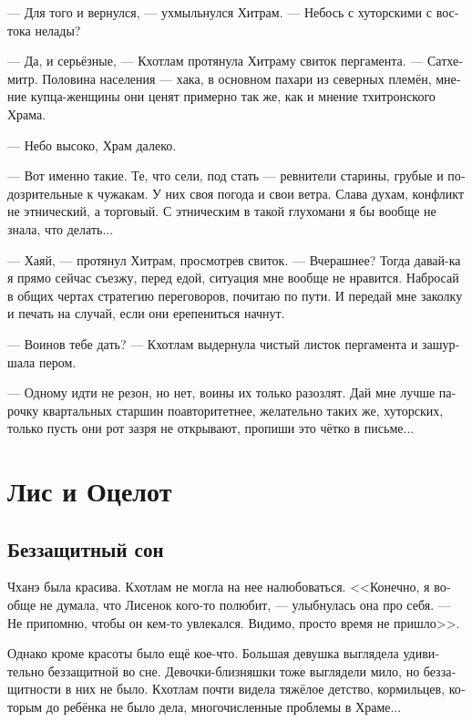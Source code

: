 \documentclass[a4paper,12pt,fleqn]{book}\usepackage{polyglossia}\setdefaultlanguage[babelshorthands=true]{russian}\setotherlanguage{english}\defaultfontfeatures{Ligatures=TeX,Mapping=tex-text}\usepackage{xcolor}\newcommand{\ml}[3]{#2}
\newcommand{\Seli}{S\r{e}l\={\i}}
\begin{document}
--- Для того и вернулся, --- ухмыльнулся Хитрам.
--- Небось с хуторскими с востока нелады?

--- Да, и серьёзные, --- Кхотлам протянула Хитраму свиток пергамента.
--- Сатхемитр.
Половина населения --- хака, в основном пахари из северных племён, мнение купца-женщины они ценят примерно так же, как и мнение тхитронского Храма.

\ml{$0$}
{--- Небо высоко, Храм далеко.}
{``They sky be high, they Fane be far.''}

\ml{$0$}
{--- Вот именно такие.}
{``Exactly their type.}
\ml{$0$}
{Те, что сели, под стать --- ревнители старины, грубые и подозрительные к чужакам.}
{\Seli\ blood there is a good match---people for tradition, rude and suspicious of strangers.}
\ml{$0$}
{У них своя погода и свои ветра.}
{They have weathers and winds of their own.}
\ml{$0$}
{Слава духам, конфликт не этнический, а торговый.}
{Praise Spirits, it's a trade conflict, not ethnic.}
С этническим в такой глухомани я бы вообще не знала, что делать...

--- Хаяй, --- протянул Хитрам, просмотрев свиток.
--- Вчерашнее?
Тогда давай-ка я прямо сейчас съезжу, перед едой, ситуация мне вообще не нравится.
Набросай в общих чертах стратегию переговоров, почитаю по пути.
И передай мне заколку и печать на случай, если они ерепениться начнут.

--- Воинов тебе дать? --- Кхотлам выдернула чистый листок пергамента и зашуршала пером.

--- Одному идти не резон, но нет, воины их только разозлят.
Дай мне лучше парочку квартальных старшин поавторитетнее, желательно таких же, хуторских, только пусть они рот зазря не открывают, пропиши это чётко в письме...

\chapter{Лис и Оцелот}

\section{Беззащитный сон}

Чханэ была красива.
Кхотлам не могла на нее налюбоваться.
<<Конечно, я вообще не думала, что Лисенок кого-то полюбит, --- улыбнулась она про себя.
--- Не припомню, чтобы он кем-то увлекался.
Видимо, просто время не пришло>>.

Однако кроме красоты было ещё кое-что.
Большая девушка выглядела удивительно беззащитной во сне.
Девочки-близняшки тоже выглядели мило, но беззащитности в них не было.
Кхотлам почти видела тяжёлое детство, кормильцев, которым до ребёнка не было дела, многочисленные проблемы в Храме...
\end{document}
